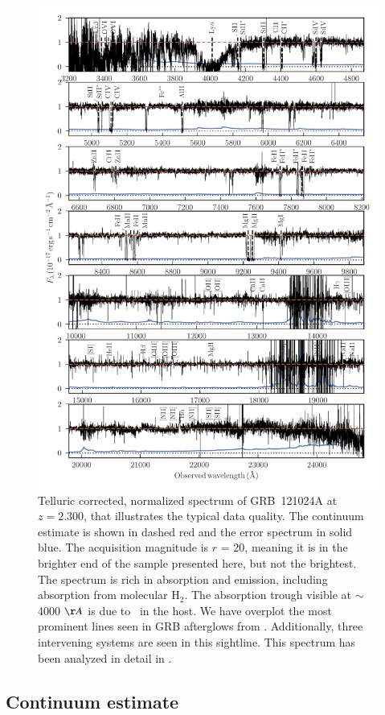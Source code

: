 \documentclass{aa}    %
\begin{document}
\begin{figure}
	\centerline{\includegraphics[width=0.85\linewidth]{figures/GRB121024A.pdf}}
\caption{Telluric corrected, normalized spectrum of GRB~121024A at $z = 2.300$,
	that illustrates the typical data quality. The continuum estimate is shown in
	dashed red and the error spectrum in solid blue. The acquisition magnitude is
	$r$ = 20, meaning it is in the brighter end of the sample presented here, but
	not the brightest. The spectrum is rich in absorption and emission, including
	absorption from molecular $\mathrm{H_2}$. The absorption trough visible at
	$\sim$ 4000 $\AA$ is due to \lya~in the host. We have overplot the most
	prominent lines seen in GRB afterglows from \citet{Christensen2011a}.
	Additionally, three intervening systems are seen in this sightline. This
	spectrum has been analyzed in detail in \citet{Friis2015}.}
\label{fig:spectrum}
\end{figure}



\subsection{Continuum estimate} \label{continuum}
\end{document}
